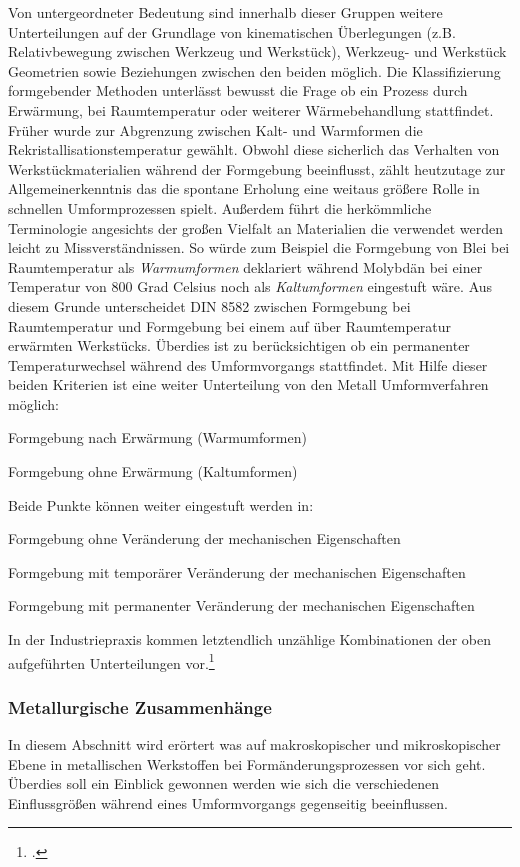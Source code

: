 \documentclass[12pt,a4paper,parskip]{scrartcl}
\begin{document}
{Von untergeordneter Bedeutung sind innerhalb dieser Gruppen  weitere Unterteilungen auf der Grundlage von kinematischen Überlegungen (z.B. Relativbewegung zwischen Werkzeug und Werkstück), Werkzeug- und Werkstück Geometrien sowie Beziehungen zwischen den beiden möglich. Die Klassifizierung formgebender Methoden unterlässt bewusst die Frage ob ein Prozess durch Erwärmung, bei Raumtemperatur oder weiterer Wärmebehandlung stattfindet. Früher  wurde zur Abgrenzung zwischen Kalt- und Warmformen die Rekristallisationstemperatur gewählt. Obwohl diese sicherlich das Verhalten  von Werkstückmaterialien während der Formgebung beeinflusst, zählt heutzutage zur Allgemeinerkenntnis das die spontane Erholung  eine weitaus größere Rolle in schnellen Umformprozessen spielt. Außerdem führt die herkömmliche Terminologie angesichts der großen Vielfalt  an Materialien die verwendet werden leicht zu Missverständnissen. So würde zum Beispiel die Formgebung von Blei bei Raumtemperatur als \emph{Warmumformen} deklariert während Molybdän bei einer Temperatur von 800 Grad Celsius noch als \emph{Kaltumformen} eingestuft wäre. Aus diesem Grunde unterscheidet DIN 8582 zwischen Formgebung bei Raumtemperatur und Formgebung bei einem auf über Raumtemperatur erwärmten Werkstücks. Überdies ist zu berücksichtigen ob ein permanenter Temperaturwechsel während des Umformvorgangs stattfindet. Mit Hilfe dieser beiden Kriterien ist eine weiter Unterteilung von den Metall Umformverfahren möglich:

\begin{enumerate*}
\item Formgebung nach Erwärmung (Warmumformen)
\item Formgebung ohne Erwärmung (Kaltumformen)
\end{enumerate*}

Beide Punkte können weiter eingestuft werden in:

\begin{itemize*}
\item Formgebung ohne Veränderung der mechanischen Eigenschaften
\item Formgebung mit temporärer Veränderung der mechanischen Eigenschaften
\item Formgebung mit permanenter Veränderung der mechanischen Eigenschaften
\end{itemize*}

In der Industriepraxis kommen letztendlich unzählige Kombinationen der oben aufgeführten Unterteilungen vor.\footcite[Vgl.][2.1ff]{kl}
\subsubsection{Metallurgische Zusammenhänge}
In diesem Abschnitt wird erörtert was auf makroskopischer und mikroskopischer Ebene in metallischen Werkstoffen bei Formänderungsprozessen vor sich geht. Überdies soll ein Einblick gewonnen werden wie sich die verschiedenen Einflussgrößen während eines Umformvorgangs gegenseitig beeinflussen.


}
\end{document}
